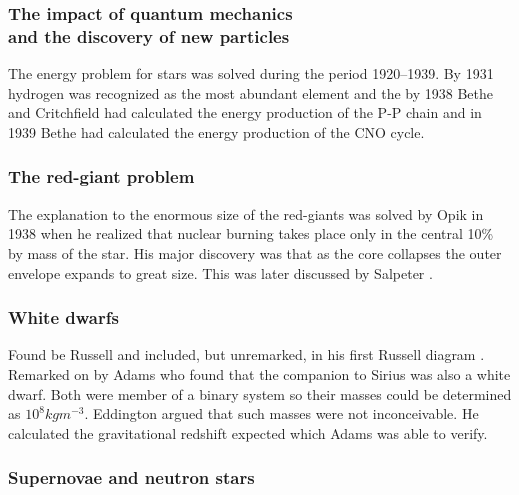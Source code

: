 \subsubsection{The impact of quantum mechanics\\ and the discovery of new particles}

The energy problem for stars was solved during the period
1920--1939. By 1931  hydrogen was recognized as the
most abundant element and the by 1938 Bethe and
Critchfield \cite{Bethe1938} had calculated the energy production of
the P-P chain and in 1939 Bethe had calculated the energy production
of the CNO cycle.

\subsubsection{The red-giant problem}

The explanation  to the enormous size of the
red-giants was solved by Opik in 1938 \cite{Opik1938} when he realized
that nuclear burning takes place only in the central 10\% by mass of
the star. His major discovery was that as the core collapses the outer
envelope expands to great size.  This was later discussed by
Salpeter \cite{Salpeter1952}.

\subsubsection{White dwarfs}

Found be Russell  and included, but unremarked, in
his first Russell diagram \cite{Russell1914a, Russell1914b}.  Remarked
on by Adams \cite{Adams1914, Adams1915} who found that the companion
to Sirius was also a white dwarf.  Both were member of a binary system
so their masses could be determined as $10^8 kg m^{-3}$.
Eddington \cite{Eddington1924} argued that such masses were not
inconceivable. He calculated the gravitational redshift expected which
Adams \cite{Adams1925} was able to verify.


\subsubsection{Supernovae and neutron stars}

